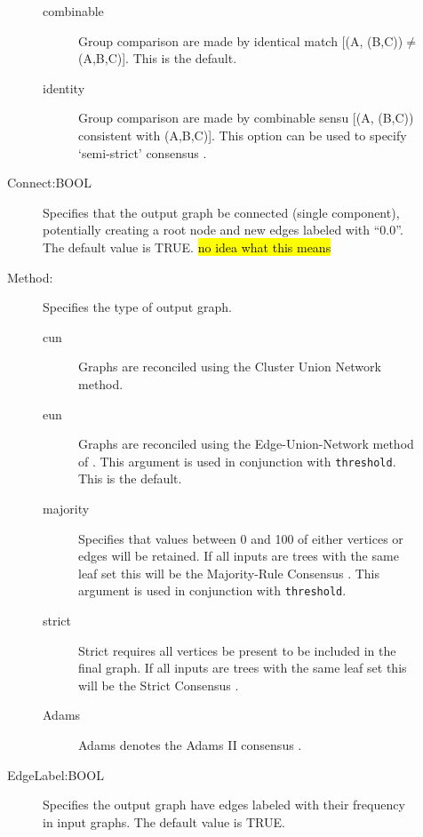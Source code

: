 \begin{description}
\begin{description}
			\begin{description}
				\item[combinable] Group comparison are made by identical match 
				[(A, (B,C))$\neq$(A,B,C)]. This is the default.	
								
				\item[identity] Group comparison are made by combinable sensu \cite{Nelson1979}
				 [(A, (B,C)) consistent with (A,B,C)]. This option can be used to specify `semi-strict' 
				 consensus \citep{Bremer1990}.
			\end{description}
			
			\item [Connect:BOOL] Specifies that the output graph be connected 
			(single component), potentially creating a root node and new edges labeled 
			with ``0.0''. The default value is TRUE. \hl{no idea what this means} 
			
			\item [Method:] Specifies the type of output graph. 
			
			\begin{description}
				\item[cun] Graphs are reconciled using the Cluster Union Network 
				\citep{Baroni2005} method.
				
				\item[eun] Graphs are reconciled using the Edge-Union-Network method of 
				\citep{MiyagiandWheeler2019}. This argument is used in conjunction with 
				\texttt{threshold}. This is the default.
				
				\item[majority] Specifies that values between 0 and 100 of either vertices or 
				edges will be retained. If all inputs are trees with the same leaf set this will 
				be the Majority-Rule Consensus \citep{MargushandMcMorris1981}. This
				argument is used in conjunction with \texttt{threshold}.

				\item[strict] Strict requires all vertices be present to be included in the final graph. 
				If all inputs are trees with the same leaf set this will be the Strict Consensus 
				\citep{Schuhandpolhemus1980}. 

				\item[Adams] Adams denotes the Adams II consensus \citep{Adams1972}.
			\end{description}
		
			\item [EdgeLabel:BOOL] Specifies the output graph have edges 
			labeled with their frequency in input graphs. The default value is TRUE.			
			

\end{description}
\end{description}
